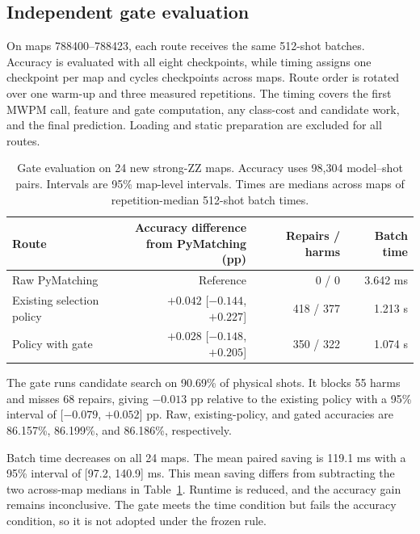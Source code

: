\documentclass[aps,prd,12pt,twocolumn,superscriptaddress,floatfix]{revtex4-2}
\begin{document}
\subsection{Independent gate evaluation}

On maps 788400--788423, each route receives the same 512-shot batches. Accuracy is evaluated with all eight checkpoints, while timing assigns one checkpoint per map and cycles checkpoints across maps. Route order is rotated over one warm-up and three measured repetitions. The timing covers the first MWPM call, feature and gate computation, any class-cost and candidate work, and the final prediction. Loading and static preparation are excluded for all routes.

\begin{table}[tb]
\centering
\caption{Gate evaluation on 24 new strong-ZZ maps. Accuracy uses 98,304 model--shot pairs. Intervals are 95\% map-level intervals. Times are medians across maps of repetition-median 512-shot batch times.}
\label{tab:gate}
\small
\begin{tabularx}{\textwidth}{@{}>{\raggedright\arraybackslash}X rrr@{}}
\toprule
Route & \shortstack{Accuracy difference\\from PyMatching (pp)} & Repairs / harms & Batch time \\
\midrule
Raw PyMatching & Reference & 0 / 0 & 3.642 ms \\
Existing selection policy & \(+0.042\) [\(-0.144\), \(+0.227\)] & 418 / 377 & 1.213 s \\
Policy with gate & \(+0.028\) [\(-0.148\), \(+0.205\)] & 350 / 322 & 1.074 s \\
\bottomrule
\end{tabularx}
\end{table}

The gate runs candidate search on 90.69\% of physical shots. It blocks 55 harms and misses 68 repairs, giving \(-0.013\) pp relative to the existing policy with a 95\% interval of [\(-0.079\), \(+0.052\)] pp. Raw, existing-policy, and gated accuracies are 86.157\%, 86.199\%, and 86.186\%, respectively.

Batch time decreases on all 24 maps. The mean paired saving is 119.1 ms with a 95\% interval of [97.2, 140.9] ms. This mean saving differs from subtracting the two across-map medians in Table~\ref{tab:gate}. Runtime is reduced, and the accuracy gain remains inconclusive. The gate meets the time condition but fails the accuracy condition, so it is not adopted under the frozen rule.
\end{document}
